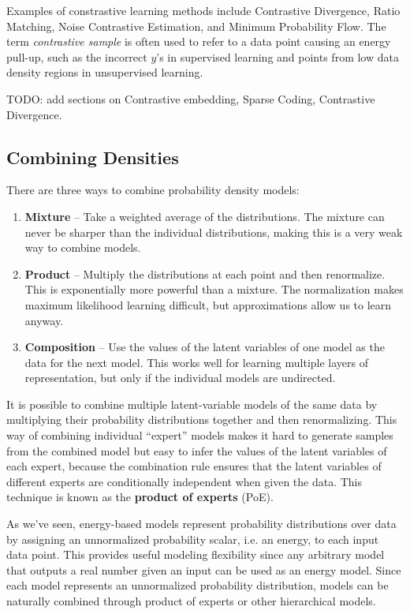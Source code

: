 \documentclass{article}
\begin{document}
Examples of constrastive learning methods include Contrastive Divergence, Ratio Matching, Noise Contrastive Estimation, and Minimum Probability Flow. The term \textit{contrastive sample} is often used to refer to a data point causing an energy pull-up, such as the incorrect $y$'s in supervised learning and points from low data density regions in unsupervised learning.

TODO: add sections on Contrastive embedding, Sparse Coding, Contrastive Divergence.

\subsection{Combining Densities}
There are three ways to combine probability density models:
\begin{enumerate}
    \item \textbf{Mixture} -- Take a weighted average of the distributions. The mixture can never be sharper than the individual distributions, making this is a very weak way to combine models. 
    \item \textbf{Product} -- Multiply the distributions at each point and then renormalize. This is exponentially more powerful than a mixture. The normalization makes maximum likelihood learning difficult, but approximations allow us to learn anyway. 
    
    \item \textbf{Composition} -- Use the values of the latent variables of one model as the data for the next model. This works well for learning multiple layers of representation, but only if the individual models are undirected.
\end{enumerate}

It is possible to combine multiple latent-variable models of the same data by multiplying their probability distributions together and then renormalizing. This way of combining individual ``expert” models makes it hard to generate samples from the combined model but easy to infer the values of the latent variables of each expert, because the combination rule
ensures that the latent variables of different experts are conditionally independent when given the data. This technique is known as the \textbf{product of experts} (PoE).

As we've seen, energy-based models represent probability distributions over data by assigning an unnormalized probability scalar, i.e. an energy, to each input data point. This provides useful modeling flexibility since any arbitrary model that outputs a real number given an input can be used as an energy model. Since each model represents an unnormalized probability distribution, models can be naturally combined through product of experts or other hierarchical models.
\end{document}
